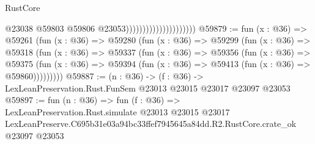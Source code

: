 \begin{lexlean}{RustCore}
\begin{coremodule}
                                              @23038
                                              @59803
                                              @59806
                                              @23053)))))))))))))))))))))
@59879 := fun (x : @36) =>
  @59261
    (fun (x : @36) =>
    @59280
      (fun (x : @36) =>
      @59299
        (fun (x : @36) =>
        @59318
          (fun (x : @36) =>
          @59337
            (fun (x : @36) =>
            @59356
              (fun (x : @36) =>
              @59375
                (fun (x : @36) => @59394 (fun (x : @36) => @59413 (fun (x : @36) => @59860)))))))))
@59887 := (n : @36) ->
  (f : @36) -> LexLeanPreservation.Rust.FunSem @23013 @23015 @23017 @23097 @23053
@59897 := fun (n : @36) =>
  fun (f : @36) =>
  LexLeanPreservation.Rust.simulate
    @23013
    @23015
    @23017
    LexLeanPreserve.C695b31e03a94bc33ffef7945645a84dd.R2.RustCore.crate_ok
    @23097
    @23053
\end{coremodule}
\end{lexlean}
